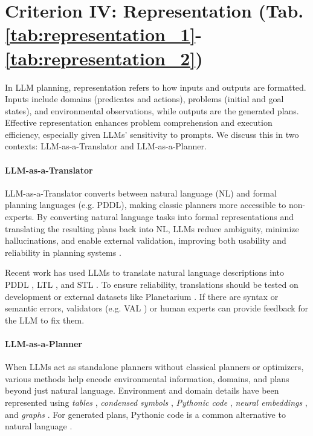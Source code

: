 \section{Criterion IV: Representation (Tab. \ref{tab:representation_1}-\ref{tab:representation_2})} \label{sec:representation}

In LLM planning, representation refers to how inputs and outputs are formatted. Inputs include domains (predicates and actions), problems (initial and goal states), and environmental observations, while outputs are the generated plans. Effective representation enhances problem comprehension and execution efficiency, especially given LLMs' sensitivity to prompts. We discuss this in two contexts: LLM-as-a-Translator and LLM-as-a-Planner. 

\vspace{-0.05in}
\paragraph{LLM-as-a-Translator} LLM-as-a-Translator converts between natural language (NL) and formal planning languages (e.g. PDDL), making classic planners more accessible to non-experts. By converting natural language tasks into formal representations and translating the resulting plans back into NL, LLMs reduce ambiguity, minimize hallucinations, and enable external validation, improving both usability and reliability in planning systems \cite{xie2023translating, zhou2024isr, sun2024adaplanner, silver2024generalized}. 

Recent work has used LLMs to translate natural language descriptions into PDDL \cite{liu2023llm+, guan2023leveraging, xie2023translating, dagan2023dynamic, zhou2024isr}, LTL \cite{pan2023data}, and STL \cite{chen2024autotamp}. To ensure reliability, translations should be tested on development or external datasets like Planetarium \cite{zuo2024planetarium}. If there are syntax or semantic errors, validators (e.g. VAL \cite{howey2004val}) or human experts can provide feedback for the LLM to fix them. 

\vspace{-0.05in}
\paragraph{LLM-as-a-Planner} When LLMs act as standalone planners without classical planners or optimizers, various methods help encode environmental information, domains, and plans beyond just natural language. Environment and domain details have been represented using \emph{tables} \cite{lin2023grounded}, \emph{condensed symbols} \cite{hu2024chain}, \emph{Pythonic code} \cite{aghzal2023can, singh2023progprompt, sun2024adaplanner}, \emph{neural embeddings} \cite{li2022pre, ahn2022can}, and \emph{graphs} \cite{lin2024graph, wu2024can}. For generated plans, Pythonic code is a common alternative to natural language \cite{singh2023progprompt, silver2024generalized}. 
